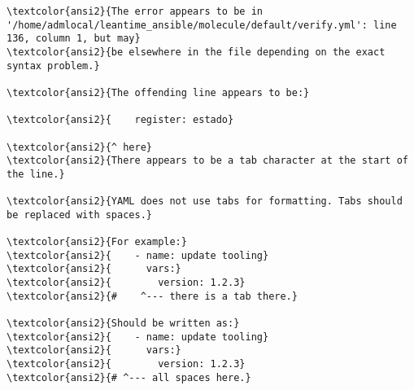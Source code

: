 \documentclass{scrartcl}
\begin{document}
\begin{Verbatim}
\textcolor{ansi2}{The error appears to be in '/home/admlocal/leantime_ansible/molecule/default/verify.yml': line 136, column 1, but may}
\textcolor{ansi2}{be elsewhere in the file depending on the exact syntax problem.}

\textcolor{ansi2}{The offending line appears to be:}

\textcolor{ansi2}{    register: estado}

\textcolor{ansi2}{^ here}
\textcolor{ansi2}{There appears to be a tab character at the start of the line.}

\textcolor{ansi2}{YAML does not use tabs for formatting. Tabs should be replaced with spaces.}

\textcolor{ansi2}{For example:}
\textcolor{ansi2}{    - name: update tooling}
\textcolor{ansi2}{      vars:}
\textcolor{ansi2}{        version: 1.2.3}
\textcolor{ansi2}{#    ^--- there is a tab there.}

\textcolor{ansi2}{Should be written as:}
\textcolor{ansi2}{    - name: update tooling}
\textcolor{ansi2}{      vars:}
\textcolor{ansi2}{        version: 1.2.3}
\textcolor{ansi2}{# ^--- all spaces here.}



\end{Verbatim}
\end{document}
